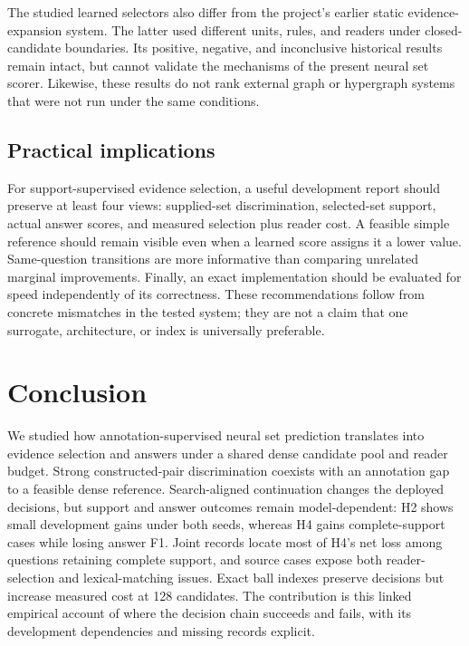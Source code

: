 \documentclass[preprint,12pt]{elsarticle}
\begin{document}
The studied learned selectors also differ from the project's earlier static evidence-expansion system. The latter used different units, rules, and readers under closed-candidate boundaries. Its positive, negative, and inconclusive historical results remain intact, but cannot validate the mechanisms of the present neural set scorer. Likewise, these results do not rank external graph or hypergraph systems that were not run under the same conditions.

\subsection{Practical implications}
For support-supervised evidence selection, a useful development report should preserve at least four views: supplied-set discrimination, selected-set support, actual answer scores, and measured selection plus reader cost. A feasible simple reference should remain visible even when a learned score assigns it a lower value. Same-question transitions are more informative than comparing unrelated marginal improvements. Finally, an exact implementation should be evaluated for speed independently of its correctness. These recommendations follow from concrete mismatches in the tested system; they are not a claim that one surrogate, architecture, or index is universally preferable.

\section{Conclusion}
We studied how annotation-supervised neural set prediction translates into evidence selection and answers under a shared dense candidate pool and reader budget. Strong constructed-pair discrimination coexists with an annotation gap to a feasible dense reference. Search-aligned continuation changes the deployed decisions, but support and answer outcomes remain model-dependent: H2 shows small development gains under both seeds, whereas H4 gains complete-support cases while losing answer F1. Joint records locate most of H4's net loss among questions retaining complete support, and source cases expose both reader-selection and lexical-matching issues. Exact ball indexes preserve decisions but increase measured cost at 128 candidates. The contribution is this linked empirical account of where the decision chain succeeds and fails, with its development dependencies and missing records explicit.
\end{document}
